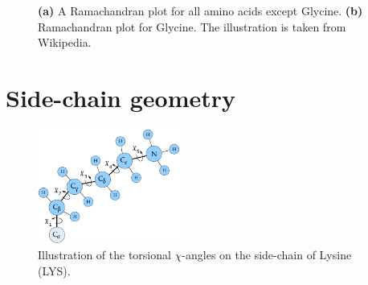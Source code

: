 \begin{figure}
	\centering
    \caption{\textbf{(a)} A Ramachandran plot for all amino
      acids except Glycine. \textbf{(b)}  Ramachandran plot
      for Glycine. The illustration is taken from Wikipedia.}
\label{fig:ramachandran}
\end{figure}


\section{Side-chain geometry}
\begin{figure}
	\centering
	\includegraphics[width=0.42\textwidth]{figures/lysine}
    \caption{Illustration of the torsional $\chi$-angles on the side-chain of Lysine (LYS).}
    \label{fig:lysine-and-chi}
\end{figure}

